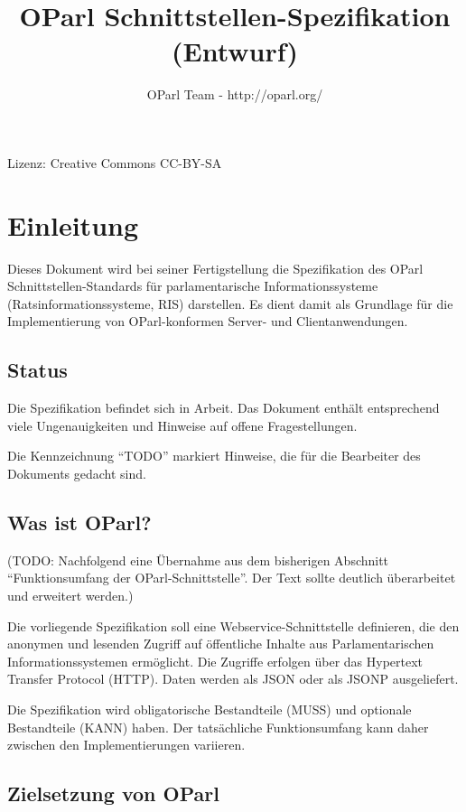 \documentclass[,a4paper]{article}
\title{OParl Schnittstellen-Spezifikation (Entwurf)}
\author{OParl Team - http://oparl.org/}
\date{}
\begin{document}
\maketitle

Lizenz: Creative Commons CC-BY-SA

\section{Einleitung}\label{einleitung}

Dieses Dokument wird bei seiner Fertigstellung die Spezifikation des
OParl Schnittstellen-Standards für parlamentarische Informationssysteme
(Ratsinformationssysteme, RIS) darstellen. Es dient damit als Grundlage
für die Implementierung von OParl-konformen Server- und
Clientanwendungen.

\subsection{Status}\label{status}

Die Spezifikation befindet sich in Arbeit. Das Dokument enthält
entsprechend viele Ungenauigkeiten und Hinweise auf offene
Fragestellungen.

Die Kennzeichnung ``TODO'' markiert Hinweise, die für die Bearbeiter des
Dokuments gedacht sind.

\subsection{Was ist OParl?}\label{was-ist-oparl}

(TODO: Nachfolgend eine Übernahme aus dem bisherigen Abschnitt
``Funktionsumfang der OParl-Schnittstelle''. Der Text sollte deutlich
überarbeitet und erweitert werden.)

Die vorliegende Spezifikation soll eine Webservice-Schnittstelle
definieren, die den anonymen und lesenden Zugriff auf öffentliche
Inhalte aus Parlamentarischen Informationssystemen ermöglicht. Die
Zugriffe erfolgen über das Hypertext Transfer Protocol (HTTP). Daten
werden als JSON oder als JSONP ausgeliefert.

Die Spezifikation wird obligatorische Bestandteile (MUSS) und optionale
Bestandteile (KANN) haben. Der tatsächliche Funktionsumfang kann daher
zwischen den Implementierungen variieren.

\subsection{Zielsetzung von OParl}\label{zielsetzung-von-oparl}
\end{document}
